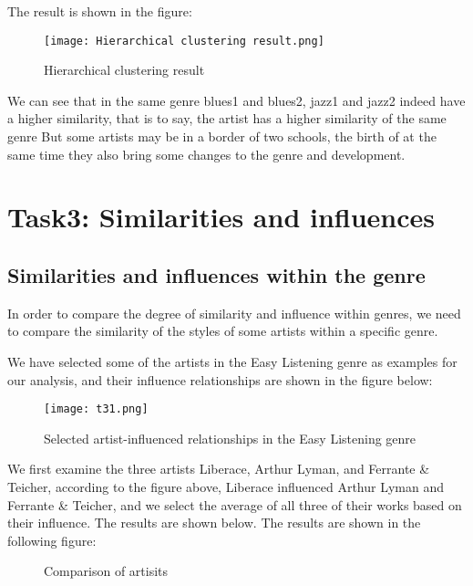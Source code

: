 \documentclass[12pt]{article}  %
\begin{document}
The result is shown in the figure:

\begin{figure}[H]
    \centering
    \texttt{[image: Hierarchical clustering result.png]}
    \caption{Hierarchical clustering result}
    \label{img}
\end{figure}

We can see that in the same genre blues1 and blues2, jazz1 and jazz2 indeed have a higher similarity, that is to say, the artist has a higher similarity of the same genre But some artists may be in a border of two schools, the birth of at the same time they also bring some changes to the genre and development.

\section{Task3: Similarities and influences}
\subsection{Similarities and influences within the genre}
In order to compare the degree of similarity and influence within genres, we need to compare the similarity of the styles of some artists within a specific genre.

We have selected some of the artists in the Easy Listening genre as examples for our analysis, and their influence relationships are shown in the figure below:

\begin{figure}[H]
	\centering
	\texttt{[image: t31.png]} 	%
	\caption{Selected artist-influenced relationships in the Easy Listening genre}		%
	\label{fig:ex4-9}
\end{figure}

We first examine the three artists Liberace, Arthur Lyman, and Ferrante \& Teicher, according to the figure above, Liberace influenced Arthur Lyman and Ferrante \& Teicher, and we select the average of all three of their works based on their influence. The results are shown below. The results are shown in the following figure:

\begin{figure}[H]
	\centering    
	\caption{Comparison of artisits}		%
	\label{fig:hot}									%
\end{figure}
\end{document}
